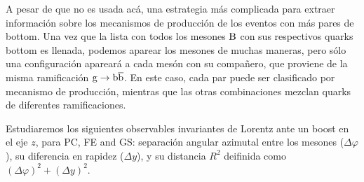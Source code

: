 A pesar de que no es usada acá, una estrategia más complicada para extraer información sobre los mecanismos de producción de los eventos con más pares de bottom. Una vez que la lista con todos los mesones ${\mathrm B}$ con sus respectivos quarks bottom es llenada, podemos aparear los mesones de muchas maneras, pero sólo una configuración apareará a cada mesón con su compañero, que proviene de la misma ramificación ${\mathrm g}\to{\mathrm b}\overline{\mathrm b}$. En este caso, cada par puede ser clasificado por mecanismo de producción, mientras que las otras combinaciones mezclan quarks de diferentes ramificaciones.

Estudiaremos los siguientes observables invariantes de Lorentz ante un boost en el eje $z$, para PC, FE and GS: separación angular azimutal entre los mesones ($\Delta\varphi$), su diferencia en rapidez ($\Delta y$), y su distancia $R^2$ deifinida como $(\Delta\varphi)^2+(\Delta y)^2$.
